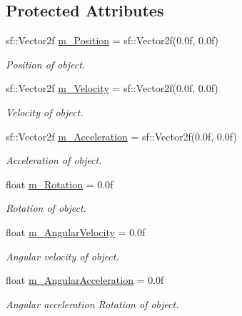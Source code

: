 \subsection*{Protected Attributes}
\begin{DoxyCompactItemize}
\item 
\mbox{\label{class_kinematic_aa25918dd272373d7ae0451d3b660feb7}} 
sf\+::\+Vector2f \hyperlink{class_kinematic_aa25918dd272373d7ae0451d3b660feb7}{m\+\_\+\+Position} = sf\+::\+Vector2f(0.\+0f, 0.\+0f)
\begin{DoxyCompactList}\small\item\em Position of object. \end{DoxyCompactList}\item 
\mbox{\label{class_kinematic_a73a21594befb8538e7de53f53dc52be6}} 
sf\+::\+Vector2f \hyperlink{class_kinematic_a73a21594befb8538e7de53f53dc52be6}{m\+\_\+\+Velocity} = sf\+::\+Vector2f(0.\+0f, 0.\+0f)
\begin{DoxyCompactList}\small\item\em Velocity of object. \end{DoxyCompactList}\item 
\mbox{\label{class_kinematic_a30a099a276dbd1aee8f0ef20a63193dc}} 
sf\+::\+Vector2f \hyperlink{class_kinematic_a30a099a276dbd1aee8f0ef20a63193dc}{m\+\_\+\+Acceleration} = sf\+::\+Vector2f(0.\+0f, 0.\+0f)
\begin{DoxyCompactList}\small\item\em Acceleration of object. \end{DoxyCompactList}\item 
\mbox{\label{class_kinematic_a3148fd60ff6257f32a6e3d7042d535d5}} 
float \hyperlink{class_kinematic_a3148fd60ff6257f32a6e3d7042d535d5}{m\+\_\+\+Rotation} = 0.\+0f
\begin{DoxyCompactList}\small\item\em Rotation of object. \end{DoxyCompactList}\item 
\mbox{\label{class_kinematic_afc52c98bc512eef24a46fc29fe6fd012}} 
float \hyperlink{class_kinematic_afc52c98bc512eef24a46fc29fe6fd012}{m\+\_\+\+Angular\+Velocity} = 0.\+0f
\begin{DoxyCompactList}\small\item\em Angular velocity of object. \end{DoxyCompactList}\item 
\mbox{\label{class_kinematic_a2f934f9423f65affa32479958694e4ad}} 
float \hyperlink{class_kinematic_a2f934f9423f65affa32479958694e4ad}{m\+\_\+\+Angular\+Acceleration} = 0.\+0f
\begin{DoxyCompactList}\small\item\em Angular acceleration Rotation of object. \end{DoxyCompactList}\end{DoxyCompactItemize}


